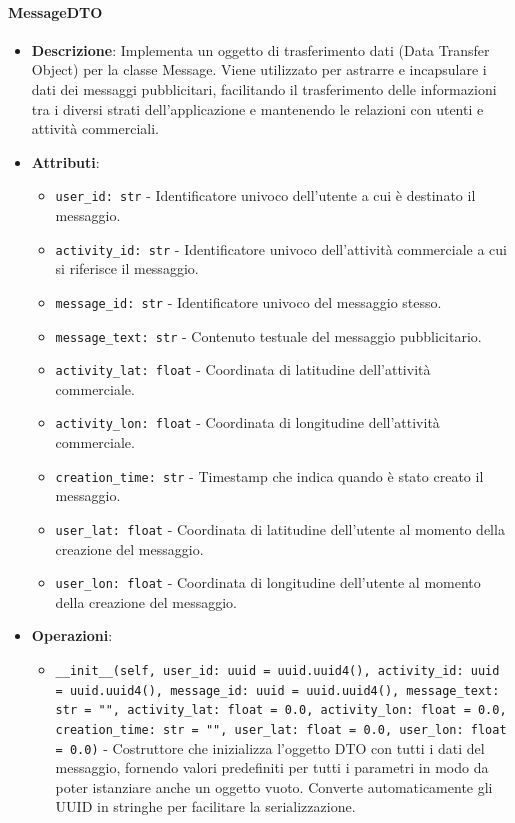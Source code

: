 \documentclass[10pt]{article}
\begin{document}
    \paragraph{MessageDTO}
    \begin{itemize} 
    \item \textbf{Descrizione}: Implementa un oggetto di trasferimento dati (Data Transfer Object) per la classe Message. Viene utilizzato per astrarre e incapsulare i dati dei messaggi pubblicitari, facilitando il trasferimento delle informazioni tra i diversi strati dell'applicazione e mantenendo le relazioni con utenti e attività commerciali.
    \item \textbf{Attributi}:
    \begin{itemize}
        \item \texttt{user\_id: str} - Identificatore univoco dell'utente a cui è destinato il messaggio.
        \item \texttt{activity\_id: str} - Identificatore univoco dell'attività commerciale a cui si riferisce il messaggio.
        \item \texttt{message\_id: str} - Identificatore univoco del messaggio stesso.
        \item \texttt{message\_text: str} - Contenuto testuale del messaggio pubblicitario.
        \item \texttt{activity\_lat: float} - Coordinata di latitudine dell'attività commerciale.
        \item \texttt{activity\_lon: float} - Coordinata di longitudine dell'attività commerciale.
        \item \texttt{creation\_time: str} - Timestamp che indica quando è stato creato il messaggio.
        \item \texttt{user\_lat: float} - Coordinata di latitudine dell'utente al momento della creazione del messaggio.
        \item \texttt{user\_lon: float} - Coordinata di longitudine dell'utente al momento della creazione del messaggio.
    \end{itemize}
    
    \item \textbf{Operazioni}:
    \begin{itemize}
        \item \texttt{\_\_init\_\_(self, user\_id: uuid = uuid.uuid4(), activity\_id: uuid = uuid.uuid4(), message\_id: uuid = uuid.uuid4(), message\_text: str = "", activity\_lat: float = 0.0, activity\_lon: float = 0.0, creation\_time: str = "", user\_lat: float = 0.0, user\_lon: float = 0.0)} - Costruttore che inizializza l'oggetto DTO con tutti i dati del messaggio, fornendo valori predefiniti per tutti i parametri in modo da poter istanziare anche un oggetto vuoto. Converte automaticamente gli UUID in stringhe per facilitare la serializzazione.
    \end{itemize}
    \end{itemize}
\end{document}
